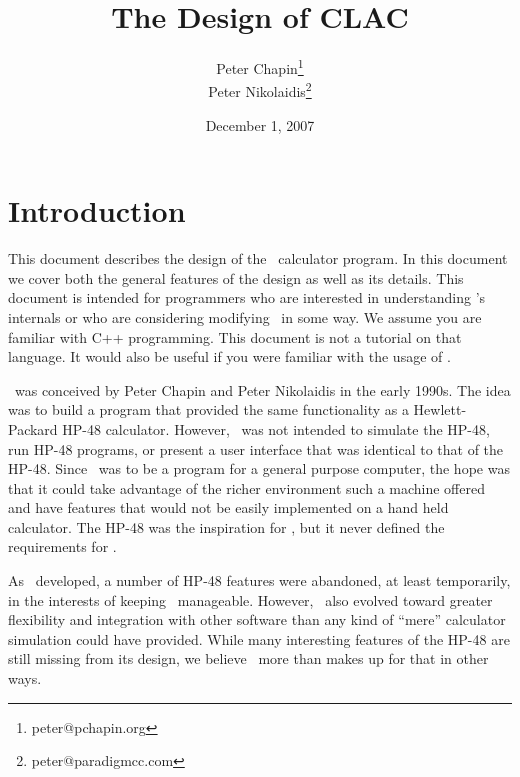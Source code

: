 \documentclass{report}
\begin{document}
\title{The Design of CLAC}
\author{Peter Chapin\thanks{peter@pchapin.org}\\
        Peter Nikolaidis\thanks{peter@paradigmcc.com}}
\date{December 1, 2007}
\maketitle

\tableofcontents
\newpage
{}

\chapter{Introduction}

This document describes the design of the \CLAC\ calculator program. In this document we cover
both the general features of the design as well as its details. This document is intended for
programmers who are interested in understanding \CLAC's internals or who are considering
modifying \CLAC\ in some way. We assume you are familiar with C++ programming. This document is
not a tutorial on that language. It would also be useful if you were familiar with the usage of
\CLAC.

\CLAC\ was conceived by Peter Chapin and Peter Nikolaidis in the early 1990s. The idea was to
build a program that provided the same functionality as a Hewlett-Packard HP-48 calculator.
However, \CLAC\ was not intended to simulate the HP-48, run HP-48 programs, or present a user
interface that was identical to that of the HP-48. Since \CLAC\ was to be a program for a
general purpose computer, the hope was that it could take advantage of the richer environment
such a machine offered and have features that would not be easily implemented on a hand held
calculator. The HP-48 was the inspiration for \CLAC, but it never defined the requirements for
\CLAC.

As \CLAC\ developed, a number of HP-48 features were abandoned, at least temporarily, in the
interests of keeping \CLAC\ manageable. However, \CLAC\ also evolved toward greater flexibility
and integration with other software than any kind of ``mere'' calculator simulation could have
provided. While many interesting features of the HP-48 are still missing from its design, we
believe \CLAC\ more than makes up for that in other ways.
\end{document}

